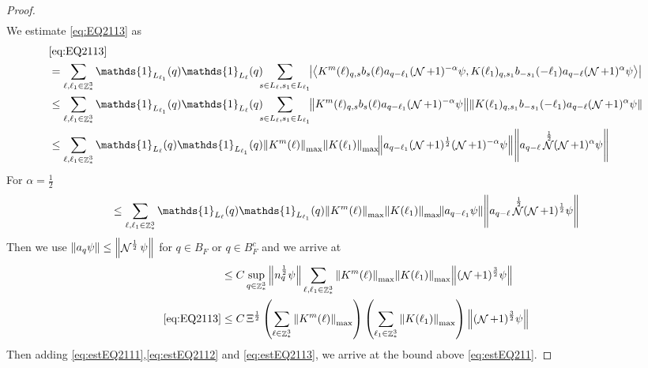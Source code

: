 \documentclass[sn-mathphys, Numbered ,a4paper]{sn-jnl}%
\DeclareMathOperator{\Z}{\mathbb{Z}}
\DeclareMathOperator{\NN}{\mathcal{N}}
\newcommand{\half}{\frac{1}{2}}
\newcommand{\eva}[1]{\left\langle #1 \right\rangle}
\theoremstyle{plain}
\theoremstyle{definition}
\theoremstyle{remark}
\theoremstyle{plain}
\theoremstyle{definition}
\theoremstyle{remark}
\begin{document}
\begin{proof}
\begin{align}
  \end{align}
  We estimate \eqref{eq:EQ2113} as
  \begin{align}
  	&\eqref{eq:EQ2113}\nonumber\\
  	&= \sum\limits_{\ell, \ell_1\in \Z^3_*} \mathds{1}_{L_{\ell_1}}(q) \mathds{1}_{L_{\ell}}(q) \!\!\! \sum\limits_{s \in L_{\ell},s_1\in L_{\ell_1}}\!\! \abs{\eva{ K^m(\ell)_{q,s} b_{s}(\ell) a_{q-\ell_1} (\NN+1)^{-\alpha}\psi, K(\ell_1)_{q,s_1} b_{-s_1}(-\ell_1) a_{q-\ell} (\NN+1)^{\alpha} \psi }}\nonumber\\
  	&\leq\sum\limits_{\ell, \ell_1\in \Z^3_*} \mathds{1}_{L_{\ell_1}}(q) \mathds{1}_{L_{\ell}}(q) \!\!\! \sum\limits_{s \in L_{\ell},s_1\in L_{\ell_1}}\!\!  \norm{ K^m(\ell)_{q,s} b_{s}(\ell) a_{q-\ell_1} (\NN+1)^{-\alpha}\psi}\norm{ K(\ell_1)_{q,s_1} b_{-s_1}(-\ell_1) a_{q-\ell} (\NN+1)^{\alpha} \psi }\nonumber\\
  	&\leq\sum\limits_{\ell, \ell_1\in \Z^3_*} \mathds{1}_{L_{\ell}}(q) \mathds{1}_{L_{\ell_1}}(q) \norm{K^m(\ell)}_{\mathrm{max}} \norm{ K(\ell_1)}_{\mathrm{max}} \!  \norm{ a_{q-\ell_1} (\NN+1)^\half (\NN+1)^{-\alpha} \psi} \norm{ a_{q-\ell} \NN^\half (\NN+1)^{\alpha} \psi }\nonumber
  \end{align}
  For $\alpha=\half$
  \begin{equation}
  	\leq\sum\limits_{\ell, \ell_1\in \Z^3_*} \mathds{1}_{L_{\ell}}(q)  \mathds{1}_{L_{\ell_1}}(q)\norm{K^m(\ell)}_{\mathrm{max}} \norm{ K(\ell_1)}_{\mathrm{max}} \! \norm{ a_{q-\ell_1} \psi} \norm{ a_{q-\ell} \NN^\half (\NN+1)^\half \psi }\nonumber
  \end{equation}
  Then we use $\norm{a_q\psi}\leq \norm{\NN^\half\psi}$ for $q \in B_F$ or $q \in B^c_F$ and we arrive at 
  \begin{align}
  	&\leq C \sup\limits_{q \in \Z^3_*} \norm{ n^\half_{q} \psi}\sum\limits_{\ell, \ell_1\in \Z^3_*} \norm{K^m(\ell)}_{\mathrm{max}} \norm{ K(\ell_1)}_{\mathrm{max}} \norm{ (\NN+1)^{\frac{3}{2}} \psi } \nonumber\\
  	\eqref{eq:EQ2113}&\leq  C \,\Xi^\half \left(\sum\limits_{\ell \in \Z^3_*} \norm{K^m(\ell)}_{\mathrm{max}}\right)\left( \sum\limits_{\ell_1\in \Z^3_*} \norm{ K(\ell_1)}_{\mathrm{max}} \right) \norm{ (\NN+1)^{\frac{3}{2}} \psi }\label{eq:estEQ2113}
  \end{align}
  Then adding \eqref{eq:estEQ2111},\eqref{eq:estEQ2112} and \eqref{eq:estEQ2113}, we arrive at the bound above \eqref{eq:estEQ211}. 
\end{proof}
\end{document}
